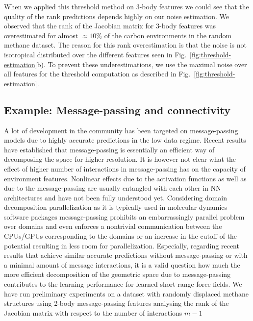 When we applied this threshold method on 3-body features we could see that the quality of the rank predictions depends highly on our noise estimation.
We observed that the rank of the Jacobian matrix for 3-body features was overestimated for almost $\approx10\%$ of the carbon environments in the random methane dataset.
The reason for this rank overestimation is that the noise is not isotropical distributed over the different features seen in Fig.~\ref{fig:threshold-estimation}b).
To prevent these underestimations, we use the maximal noise over all features for the threshold computation as described in Fig.~\ref{fig:threshold-estimation}.

\subsection{Example: Message-passing and connectivity}
A lot of development in the community has been targeted on message-passing models due to highly accurate predictions in the low data regime\cite{schutt2021equivariant,batzner20223}.
Recent results have established that message-passing is essentially an efficient way of decomposing the space for higher resolution\cite{nigam2022unified}.
It is however not clear what the effect of higher number of interactions in message-passing has on the capacity of environment features.
Nonlinear effects due to the activation functions as well as due to the message-passing are usually entangled with each other in NN architectures and have not been fully understood yet.
Considering domain decomposition parallelization as it is typically used in molecular dynamics software packages\cite{LAMMPS} message-passing prohibits an embarrassingly parallel problem over domains and even enforces a nontrivial communication between the CPUs/GPUs corresponding to the domains or an increase in the cutoff of the potential resulting in less room for parallelization.
Especially, regarding recent results that achieve similar accurate predictions without message-passing\cite{musaelian2022learning} or with a minimal amount of message interactions\cite{batatia2022mace}, it is a valid question how much the more efficient decomposition of the geometric space due to message-passing contributes to the learning performance for learned short-range force fields.
We have run preliminary experiments on a dataset with randomly displaced methane structures\cite{pozdnyakov2020dataset} using 2-body message-passing features\cite{schutt2018schnet} analysing the rank of the Jacobian matrix with respect to the number of interactions $m-1$
